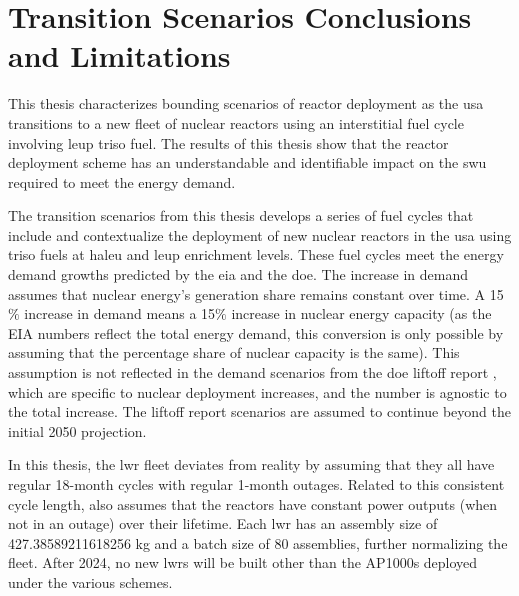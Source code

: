 \section{Transition Scenarios Conclusions and Limitations}
\label{sec:dep_conc}


This thesis characterizes bounding scenarios of reactor deployment as the \gls{usa} transitions to a new fleet of nuclear reactors using an interstitial fuel cycle involving \gls{leup} \gls{triso} fuel. The results of this thesis show that the reactor deployment scheme has an understandable and identifiable impact on the \gls{swu} required to meet the energy demand.

The transition scenarios from this thesis develops a series of fuel cycles that include and contextualize the deployment of new nuclear reactors in the \gls{usa} using \gls{triso} fuels at \gls{haleu} and \gls{leup} enrichment levels. These fuel cycles meet the energy demand growths predicted by the \gls{eia} and the \gls{doe}. The increase in demand assumes that nuclear energy's generation share remains constant over time. A 15$\%$ increase in demand means a 15$\%$ increase in nuclear energy capacity (as the EIA numbers \cite{eia_aeo_2023} reflect the total energy demand, this conversion is only possible by assuming that the percentage share of nuclear capacity is the same). This assumption is not reflected in the demand scenarios from the \gls{doe} liftoff report \cite{julie_liftoff_pathways_2024}, which are specific to nuclear deployment increases, and the number is agnostic to the total increase. The liftoff report scenarios are assumed to continue beyond the initial 2050 projection.

In this thesis, the \gls{lwr} fleet deviates from reality by assuming that they all have regular 18-month cycles with regular 1-month outages. Related to this consistent cycle length, \cyclus also assumes that the reactors have constant power outputs (when not in an outage) over their lifetime. Each \gls{lwr} has an assembly size of 427.38589211618256 kg and a batch size of 80 assemblies, further normalizing the fleet. After 2024, no new \glspl{lwr} will be built other than the AP1000s deployed under the various schemes.

